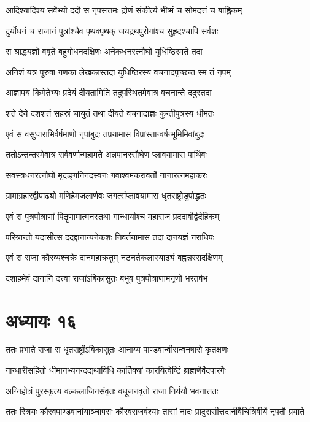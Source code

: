 \twolineshloka
{आदिश्यादिश्य सर्वेभ्यो ददौ स नृपसत्तमः}
{द्रोणं संकीर्त्य भीष्मं च सोमदत्तं च बाह्लिकम्}


\twolineshloka
{दुर्योधनं च राजानं पुत्रांश्चैव पृथक्पृथक्}
{जयद्रथपुरोगांश्च सुहृदश्चापि सर्वशः}


\twolineshloka
{स श्राद्धयज्ञो ववृते बहुगोधनदक्षिणः}
{अनेकधनरत्नौघो युधिष्ठिरमते तदा}


\twolineshloka
{अनिशं यत्र पुरुषा गणका लेखकास्तदा}
{युधिष्ठिरस्य वचनादपृच्छन्त स्म तं नृपम्}


\twolineshloka
{आज्ञापय किमेतेभ्यः प्रदेयं दीयतामिति}
{तदुपस्थितमेवात्र वचनान्ते ददुस्तदा}


\twolineshloka
{शते देये दशशतं सहस्रं चायुतं तथा}
{दीयते वचनाद्राज्ञः कुन्तीपुत्रस्य धीमतः}


\twolineshloka
{एवं स वसुधाराभिर्वर्षमाणो नृपांबुदः}
{तप्रयामास विप्रांस्तान्वर्षन्भूमिमिवांबुदः}


\twolineshloka
{ततोऽन्तन्तरमेवात्र सर्ववर्णान्महामते}
{अन्नपानरसौघेण प्लावयामास पार्थिवः}


\twolineshloka
{सवस्त्रधनरत्नौघो मृदङ्गनिनदस्वनः}
{गवाश्वमकरावर्तो नानारत्नमहाकरः}


\twolineshloka
{ग्रामाग्रहारद्वीपाढ्यो मणिहेमजलार्णवः}
{जगत्संप्लावयामास धृतराष्ट्रोडुपोद्धतः}


\twolineshloka
{एवं स पुत्रपौत्राणां पितॄणामात्मनस्तथा}
{गान्धार्याश्च महाराज प्रददावौर्द्वदेहिकम्}


\twolineshloka
{परिश्रान्तो यदासीत्स ददद्दानान्यनेकशः}
{निवर्तयामास तदा दानयज्ञं नराधिपः}


\twolineshloka
{एवं स राजा कौरव्यश्चक्रे दानमहाक्रतुम्}
{नटनर्तकलास्याढ्यं बह्वन्नरसदक्षिणम्}


\twolineshloka
{दशाहमेवं दानानि दत्त्वा राजांऽबिकासुतः}
{बभूव पुत्रपौत्राणामनृणो भरतर्षभ}


\chapter{अध्यायः १६}
\twolineshloka
{ततः प्रभाते राजा स धृतराष्ट्रोंऽबिकासुतः}
{आनाय्य पाण्डवान्वीरान्वनषासे कृतक्षणः}


\twolineshloka
{गान्धारीसहितो धीमानभ्यनन्दद्यथाविधि}
{कार्तिक्यां कारयित्वेष्टिं ब्राह्मणैर्वेदपारगैः}


\twolineshloka
{अग्निहोत्रं पुरस्कृत्य वल्कलाजिनसंवृतः}
{वधूजनवृतो राजा निर्ययौ भवनात्ततः}


\twolineshloka
{ततः स्त्रियः कौरवपाण्डवानांयाञ्चापराः कौरवराजवंश्याः}
{तासां नादः प्रादुरासीत्तदानींवैचित्रिवीर्ये नृपतौ प्रयाते}


